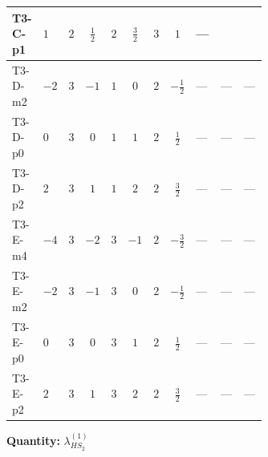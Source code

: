 \documentclass[8pt]{article}
\begin{document}
\begin{landscape}
\begin{longtable}{@{}llcccccc >{\raggedright\arraybackslash}p{0.21\linewidth} >{\raggedright\arraybackslash}p{0.21\linewidth} >{\raggedright\arraybackslash}p{0.21\linewidth}@{}}
\midrule
T3-C-p1 & $1$ & $2$ & $\frac{1}{2}$ & $2$ & $\frac{3}{2}$ & $3$ & $1$ & --- & \scriptsize\adjustbox{max width=\linewidth}{$\begin{gathered} +\frac{9 {g_2}^4}{4}\end{gathered}$} & \scriptsize\adjustbox{max width=\linewidth}{$\begin{gathered} -9 {g_2}^2 {\lambda_{HS_2}^{(1)}}\end{gathered}$} \\
\midrule
T3-D-m2 & $-2$ & $3$ & $-1$ & $1$ & $0$ & $2$ & $-\frac{1}{2}$ & --- & --- & --- \\
\midrule
T3-D-p0 & $0$ & $3$ & $0$ & $1$ & $1$ & $2$ & $\frac{1}{2}$ & --- & --- & --- \\
\midrule
T3-D-p2 & $2$ & $3$ & $1$ & $1$ & $2$ & $2$ & $\frac{3}{2}$ & --- & --- & --- \\
\midrule
T3-E-m4 & $-4$ & $3$ & $-2$ & $3$ & $-1$ & $2$ & $-\frac{3}{2}$ & --- & --- & --- \\
\midrule
T3-E-m2 & $-2$ & $3$ & $-1$ & $3$ & $0$ & $2$ & $-\frac{1}{2}$ & --- & --- & --- \\
\midrule
T3-E-p0 & $0$ & $3$ & $0$ & $3$ & $1$ & $2$ & $\frac{1}{2}$ & --- & --- & --- \\
\midrule
T3-E-p2 & $2$ & $3$ & $1$ & $3$ & $2$ & $2$ & $\frac{3}{2}$ & --- & --- & --- \\
\midrule
\bottomrule
\end{longtable}
\clearpage
\noindent\textbf{Quantity: }$\lambda_{HS_2}^{(1)}$\par\smallskip

\end{landscape}
\end{document}

